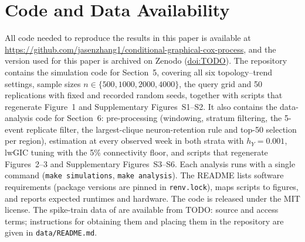 
\section*{Code and Data Availability}

All code needed to reproduce the results in this paper is available at
\url{https://github.com/jasenzhang1/conditional-graphical-cox-process}, and the
version used for this paper is archived on Zenodo (\href{https://doi.org/TODO}{doi:TODO}).
The repository contains the simulation code for Section~5, covering all six
topology--trend settings, sample sizes $n \in \{500, 1000, 2000, 4000\}$, the
query grid and 50 replications with fixed and recorded random seeds, together
with scripts that regenerate Figure~1 and Supplementary Figures~S1--S2. It also
contains the data-analysis code for Section~6: pre-processing (windowing,
stratum filtering, the 5-event replicate filter, the largest-clique
neuron-retention rule and top-50 selection per region), estimation at every
observed week in both strata with $h_Y = 0.001$, lwGIC tuning with the 5\%
connectivity floor, and scripts that regenerate Figures~2--3 and Supplementary
Figures~S3--S6. Each analysis runs with a single command (\texttt{make simulations},
\texttt{make analysis}). The README lists software requirements (package versions
are pinned in \texttt{renv.lock}), maps scripts to figures, and reports expected
runtimes and hardware. The code is released under the MIT license. The spike-train
data of \citet{zwang2025} are available from TODO: source and access terms;
instructions for obtaining them and placing them in the repository are given in
\texttt{data/README.md}.
